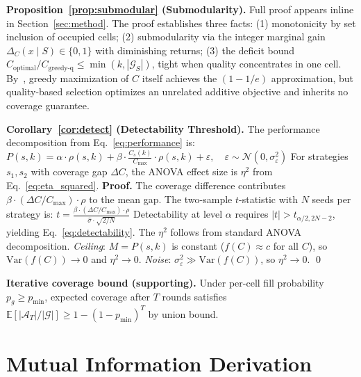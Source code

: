 \documentclass{article}
\theoremstyle{plain}
\theoremstyle{remark}
\begin{document}
\textbf{Proposition~\ref{prop:submodular} (Submodularity).}
Full proof appears inline in Section~\ref{sec:method}. The proof establishes three facts: (1) monotonicity by set inclusion of occupied cells; (2) submodularity via the integer marginal gain $\Delta_C(x \mid S) \in \{0,1\}$ with diminishing returns; (3) the deficit bound $C_{\text{optimal}}/C_{\text{greedy-q}} \leq \min(k, |\mathcal{G}_S|)$, tight when quality concentrates in one cell. By~\citet[Theorem~4.1]{nemhauser1978analysis}, greedy maximization of $C$ itself achieves the $(1-1/e)$ approximation, but quality-based selection optimizes an unrelated additive objective and inherits no coverage guarantee.

\textbf{Corollary~\ref{cor:detect} (Detectability Threshold).}
The performance decomposition from Eq.~\ref{eq:performance} is:
$P(s,k) = \alpha \cdot \rho(s,k) + \beta \cdot \frac{C_s(k)}{C_{\max}} \cdot \rho(s,k) + \varepsilon, \quad \varepsilon \sim \mathcal{N}(0, \sigma^2_\varepsilon)$
For strategies $s_1, s_2$ with coverage gap $\Delta C$, the ANOVA effect size is $\eta^2$ from Eq.~\ref{eq:eta_squared}.
\textbf{Proof.}
The coverage difference contributes $\beta \cdot (\Delta C / C_{\max}) \cdot \rho$ to the mean gap.
The two-sample $t$-statistic with $N$ seeds per strategy is:
$t = \frac{\beta \cdot (\Delta C / C_{\max}) \cdot \rho}{\hat{\sigma} \cdot \sqrt{2/N}}$
Detectability at level $\alpha$ requires $|t| > t_{\alpha/2, 2N-2}$, yielding Eq.~\ref{eq:detectability}.
The $\eta^2$ follows from standard ANOVA decomposition.
\emph{Ceiling}: $M = P(s,k)$ is constant ($f(C) \approx c$ for all $C$), so $\text{Var}(f(C)) \to 0$ and $\eta^2 \to 0$.
\emph{Noise}: $\sigma^2_\varepsilon \gg \text{Var}(f(C))$, so $\eta^2 \to 0$. \qed

\textbf{Iterative coverage bound (supporting).}
Under per-cell fill probability $p_g \geq p_{\min}$, expected coverage after $T$ rounds satisfies $\mathbb{E}[|\mathcal{A}_T|/|\mathcal{G}|] \geq 1 - (1-p_{\min})^T$ by union bound.

\section{Mutual Information Derivation}
\label{sec:proof_mi}
\end{document}
